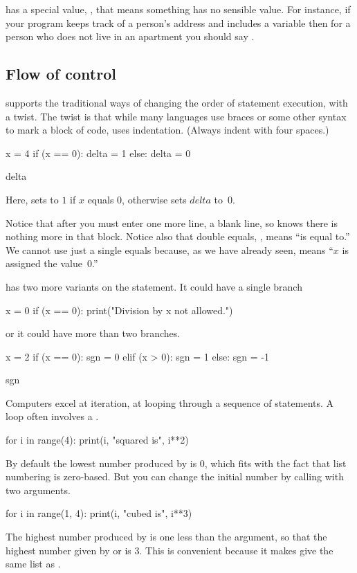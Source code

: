 \python{} has a special value, , that
means something has no sensible value.
For instance, if your program keeps track of a person's address and
includes a variable  then   
for a person who does not live in an
apartment you should say .



\subsection{Flow of control}
\python{} supports the traditional ways of changing the order of 
statement execution, with a twist.
The twist is that while many languages use braces or some other syntax to
mark a block of code, \python{} uses indentation.
(Always indent with four spaces.)
\begin{pythonconsole}
x = 4
if (x == 0):
    delta = 1
else:
    delta = 0

delta
\end{pythonconsole}
\noindent
Here, \python{} sets  to  $1$ if $x$
equals $0$, otherwise \python{} sets $delta$ to~$0$. 

Notice that after  you must enter one more line, 
a blank line, so \python{} knows there is nothing more in that block.
Notice also that double equals, \inlinecode{==}, means ``is equal to.'' 
We cannot use just a single equals because, as we have already seen, 
means ``$x$ is assigned the value~$0$.'' 

\python{} has two more variants on the  statement.
It could have a single branch
\begin{pythonconsole}
x = 0
if (x == 0):
    print("Division by x not allowed.")

\end{pythonconsole}
or it could have more than two branches.
\begin{pythonconsole}
x = 2
if (x == 0):
    sgn = 0
elif (x > 0):
    sgn = 1
else:
    sgn = -1

sgn
\end{pythonconsole}

Computers excel at iteration, at looping through a sequence of statements.
A  loop often involves a .
\begin{pythonconsole}
for i in range(4):
    print(i, "squared is", i**2)

\end{pythonconsole}
\noindent
By default the lowest number produced by  is $0$, which
fits with the fact that list numbering is zero-based.
But you can change the initial number by calling  
with two arguments.
\begin{pythonconsole}
for i in range(1, 4):
    print(i, "cubed is", i**3)

\end{pythonconsole}
The highest number produced by  is one less than the 
argument, so that the highest number
given by  or  is $3$.
This is convenient because it makes  give 
the same list as .

